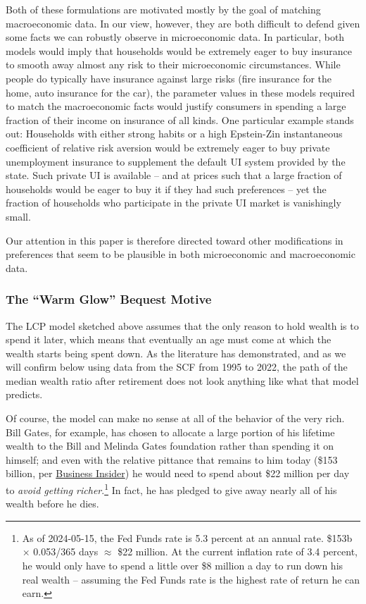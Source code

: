 \documentclass{article}
\begin{document}
Both of these formulations are motivated mostly by the goal of matching macroeconomic data.
In our view, however, they are both difficult to defend given some facts we can robustly observe in microeconomic data.
In particular, both models would imply that households would be extremely eager to buy insurance to smooth away almost any risk to their microeconomic circumstances.
While people do typically have insurance against large risks (fire insurance for the home, auto insurance for the car), the parameter values in these models required to match the macroeconomic facts would justify consumers in spending a large fraction of their income on insurance of all kinds.
One particular example stands out: Households with either strong habits or a high Epstein-Zin instantaneous coefficient of relative risk aversion would be extremely eager to buy private unemployment insurance to supplement the default UI system provided by the state.
Such private UI is available -- and at prices such that a large fraction of households would be eager to buy it if they had such preferences -- yet the fraction of households who participate in the private UI market is vanishingly small.

Our attention in this paper is therefore directed toward other modifications in preferences that seem to be plausible in both microeconomic and macroeconomic data.

\subsubsection{The ``Warm Glow'' Bequest Motive}

The LCP model sketched above assumes that the only reason to hold wealth is to spend it later, which means that eventually an age must come at which the wealth starts being spent down.
As the literature has demonstrated, and as we will confirm below using data from the SCF from 1995 to 2022, the path of the median wealth ratio after retirement does not look anything like what that model predicts.

Of course, the model can make no sense at all of the behavior of the very rich.
Bill Gates, for example, has chosen to allocate a large portion of his lifetime wealth to the Bill and Melinda Gates foundation rather than spending it on himself; and even with the relative pittance that remains to him today (\$153 billion, per \href{https://www.businessinsider.com/how-bill-gates-spends-fortune}{Business Insider}) he would need to spend about \$22 million per day to \textit{avoid getting richer}.\footnote{As of 2024-05-15, the Fed Funds rate is 5.3 percent at an annual rate.
\$153b $\times$ 0.053/365 days $\approx$ \$22 million.
At the current inflation rate of 3.4 percent, he would only have to spend a little over \$8 million a day to run down his real wealth -- assuming the Fed Funds rate is the highest rate of return he can earn.}
In fact, he has pledged to give away nearly all of his wealth before he dies.
\end{document}
